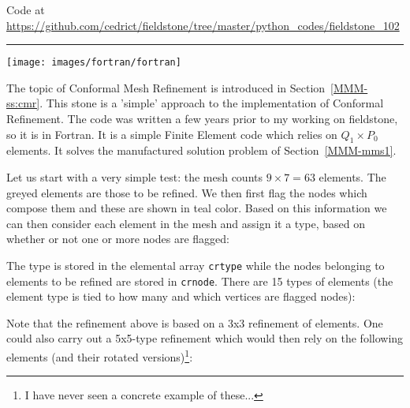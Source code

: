 

\begin{center}
Code at \url{https://github.com/cedrict/fieldstone/tree/master/python_codes/fieldstone_102}
\end{center}

\par\noindent\rule{\textwidth}{0.4pt}



\begin{center}
\texttt{[image: images/fortran/fortran]} 
\end{center}

The topic of Conformal Mesh Refinement is introduced in Section~\ref{MMM-ss:cmr}.
This stone is a 'simple' approach to the implementation of Conformal Refinement. The code was written 
a few years prior to my working on fieldstone, so it is in Fortran. It is a 
simple Finite Element code which relies on $Q_1\times P_0$ elements. It solves the 
manufactured solution problem of Section~\ref{MMM-mms1}.

Let us start with a very simple test: the mesh counts $9\times 7=63$ elements.
The greyed elements are those to be refined. We then first flag 
the nodes which compose them and these are shown in teal color.
Based on this information we can then consider each element in the mesh and assign it a type, 
based on whether or not one or more nodes are flagged: 

\begin{center}

\end{center}

The type is stored in the elemental array {\tt crtype} while the nodes belonging to elements 
to be refined are stored in {\tt crnode}.
There are 15 types of elements (the element type is tied to how many and which vertices are flagged nodes):

\begin{center}

\end{center}

Note that the refinement above is based on a 3x3 refinement of elements. One could also carry out a 5x5-type
refinement which would then rely on the following elements (and their rotated versions)\footnote{I have never
seen a concrete example of these...}:
\begin{center}

\end{center}

